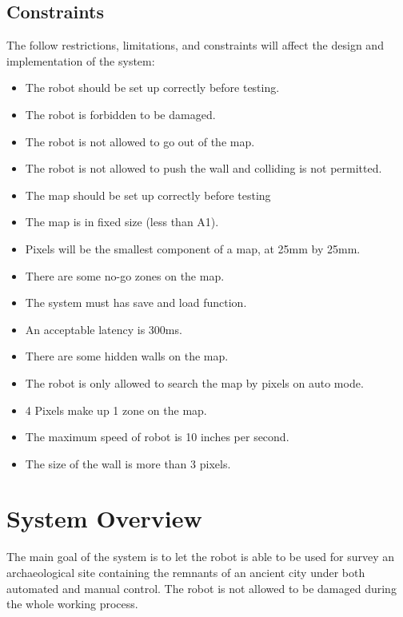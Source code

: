 \documentclass[11pt, a4paper]{report}
\begin{document}
\section{Constraints}
The follow restrictions, limitations, and constraints will affect the design and implementation of the system:
\begin{itemize}
  \item The robot should be set up correctly before testing.
  \item The robot is forbidden to be damaged.
  \item The robot is not allowed to go out of the map.
  \item The robot is not allowed to push the wall and colliding is not permitted.
  \item The map should be set up correctly before testing
  \item The map is in fixed size (less than A1).
  \item Pixels will be the smallest component of a map, at 25mm by 25mm.
  \item There are some no-go zones on the map.
  \item The system must has save and load function.
  \item An acceptable latency is 300ms.
  \item There are some hidden walls on the map.
  \item The robot is only allowed to  search the map by pixels on auto mode.
  \item 4 Pixels make up 1 zone on the map.
  \item The maximum speed of robot is 10 inches per second.
  \item The size of the wall is more than 3 pixels.
\end{itemize}


\pagebreak


\chapter{System Overview}%
\label{cha:SO}
The main goal of the system is to let the robot is able to be used for survey an archaeological site containing the remnants of an ancient city under both automated and manual control. 
The robot is not allowed to be damaged during the whole working process.
\par\vspace{\baselineskip}
\par\vspace{\baselineskip}
\end{document}
